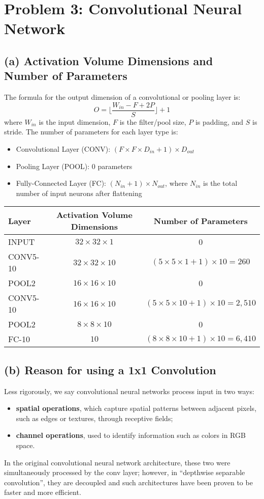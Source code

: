 \documentclass[11pt, a4paper, oneside]{memoir}
\begin{document}
\chapter{Problem 3: Convolutional Neural Network}
\section*{(a) Activation Volume Dimensions and Number of Parameters}
The formula for the output dimension of a convolutional or pooling layer is:
\[ O = \lfloor \frac{W_{in} - F + 2P}{S} \rfloor + 1 \]
where $W_{in}$ is the input dimension, $F$ is the filter/pool size, $P$ is padding, and $S$ is stride.
The number of parameters for each layer type is:
\begin{itemize}
    \item Convolutional Layer (CONV): $(F \times F \times D_{in} + 1) \times D_{out}$
    \item Pooling Layer (POOL): 0 parameters
    \item Fully-Connected Layer (FC): $(N_{in} + 1) \times N_{out}$, where $N_{in}$ is the total number of input neurons after flattening
\end{itemize}

\begin{table}[H]
\centering
\begin{tabular}{lcc}
\toprule
Layer & Activation Volume Dimensions & Number of Parameters \\
\midrule
INPUT & $32 \times 32 \times 1$ & 0 \\
CONV5-10 & $32 \times 32 \times 10$ & $(5 \times 5 \times 1 + 1) \times 10 = 260$ \\
POOL2 & $16 \times 16 \times 10$ & 0 \\
CONV5-10 & $16 \times 16 \times 10$ & $(5 \times 5 \times 10 + 1) \times 10 = 2,510$ \\
POOL2 & $8 \times 8 \times 10$ & 0 \\
FC-10 & $10$ & $(8 \times 8 \times 10 + 1) \times 10 = 6,410$ \\
\bottomrule
\end{tabular}
\end{table}

\section*{(b) Reason for using a 1x1 Convolution}
Less rigorously, we say convolutional neural networks process input in two ways:
\begin{itemize}
    \item \textbf{spatial operations}, which capture spatial patterns between adjacent pixels, such as edges or textures, through receptive fields;
    \item \textbf{channel operations}, used to identify information such as colors in RGB space.
\end{itemize}
In the original convolutional neural network architecture, these two were simultaneously processed by the conv layer;
however, in ``depthwise separable convolution'', they are decoupled and such architectures have been proven to be faster and more efficient.
\end{document}
